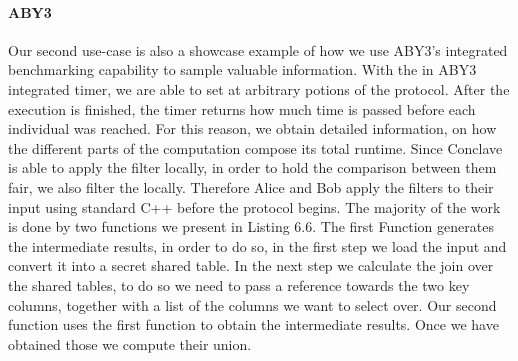 \paragraph{ABY3}
Our second use-case is also a showcase example of how we use ABY3's integrated benchmarking capability to sample valuable information. With the in ABY3 integrated timer, we are able to set  at arbitrary potions of the protocol. After the execution is finished, the timer returns how much time is passed before each individual  was reached. For this reason, we obtain detailed information, on how the different parts of the computation compose its total runtime. Since Conclave is able to apply the filter locally, in order to hold the comparison between them fair, we also filter the locally. Therefore Alice and Bob apply the filters to their input using standard C++ before the protocol begins. The majority of the work is done by two functions we present in Listing 6.6. The first Function generates the intermediate results, in order to do so, in the first step we load the input and convert it into a secret shared table. In the next step we calculate the join over the shared tables, to do so we need to pass a reference towards the two key columns, together with a list of the columns we want to select over. Our second function uses the first function to obtain the intermediate results. Once we have obtained those we compute their union.           
